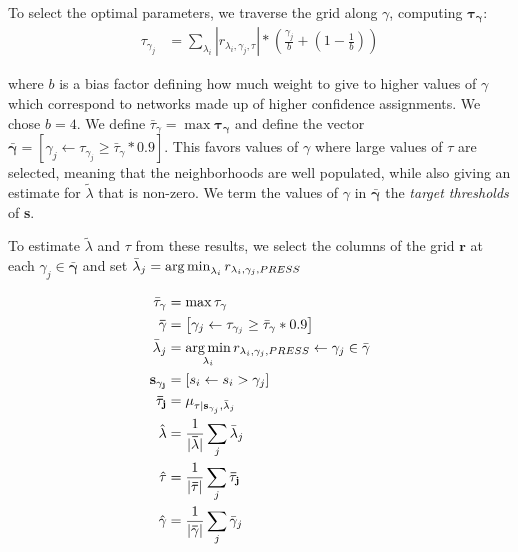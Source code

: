         To select the optimal parameters, we traverse the grid along
        $\gamma$, computing $\mathbf{\tau_\gamma}$:
        \begin{align}
            \tau_{\gamma_j} &= \sum_{\lambda_i}|r_{\lambda_i, \gamma_j, \tau}| * \left(
                \frac{\gamma_j}{b} + (1 - \frac{1}{b})\right)
        \end{align}

        \noindent where $b$ is a bias factor defining how much
        weight to give to higher values of $\gamma$ which
        correspond to networks made up of higher confidence
        assignments. We chose $b = 4$. We define ${\bar \tau_\gamma} =
        \max{\mathbf{\tau_\gamma}}$ and define the  vector
        $\mathbf{\bar \gamma} = \left[\gamma_j \leftarrow\tau_{\gamma_j}
        \ge {\bar \tau_\gamma} * 0.9\right]$. This favors values of
        $\gamma$ where large values of $\tau$ are selected, meaning that
        the neighborhoods are well populated, while also giving an estimate
        for ${\tilde \lambda}$ that is non-zero. We term the values of
        $\gamma$ in $\mathbf{{\bar \gamma}}$ the {\em target thresholds}
        of \textbf{s}.

        To estimate ${\tilde \lambda}$ and $\tau$ from these results,
        we select the columns of the grid $\mathbf{r}$ at each $\gamma_j
        \in \mathbf{{\bar \gamma}}$ and set ${\bar \lambda_j} =
        \operatorname*{arg\,min}_{\lambda_i}{r_{\lambda_i, \gamma_j, PRESS}}$

        \begin{align}
        {\bar \tau_\gamma} &= \max{\mathbf{\tau_\gamma}}\\
        \mathbf{\bar \gamma} &= \left[\gamma_j \leftarrow\tau_{\gamma_j}
            \ge {\bar \tau_\gamma} * 0.9\right]\\
        {\bar \lambda}_j &= \operatorname*{arg\,min}_{\lambda_i}{r_{
            \lambda_i, \gamma_j, PRESS}} \leftarrow \gamma_j \in {\bar \gamma}\\
        \mathbf{s_{\gamma_j}} &= [s_i \leftarrow s_i > \gamma_j] \\
        \mathbf{{\bar \tau_j}} &= \mu_{\tau|\mathbf{s}_{\gamma_j}, {\bar \lambda}_j}\\
        {\hat \lambda} &= \frac{1}{|\mathbf{{\bar \lambda}}|}\sum_j {\bar \lambda}_j\\
        {\hat \tau} &= \frac{1}{|\mathbf{{\bar \tau}}|}\sum_j \mathbf{{\bar \tau_j}}\\
        {\hat \gamma} &= \frac{1}{|\mathbf{{\bar \gamma}}|}\sum_j {\bar \gamma}_j
        \end{align}

